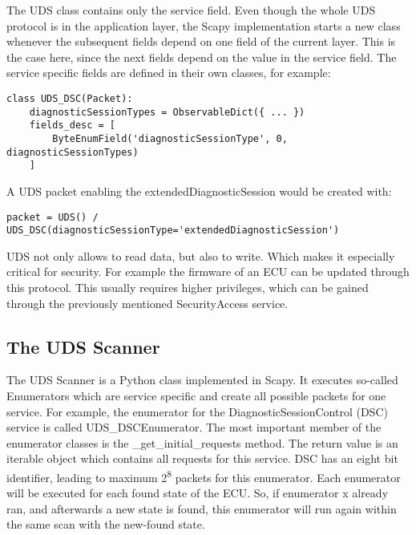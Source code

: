 
The UDS class contains only the service field. Even though the whole UDS protocol is in the application layer, the Scapy implementation starts a new class whenever the subsequent fields depend on one field of the current layer. This is the case here, since the next fields depend on the value in the service field. The service specific fields are defined in their own classes, for example:

\begin{samepage}
\begin{verbatim}
class UDS_DSC(Packet):
    diagnosticSessionTypes = ObservableDict({ ... })
    fields_desc = [
        ByteEnumField('diagnosticSessionType', 0,  diagnosticSessionTypes)
    ]
\end{verbatim}
\end{samepage}

A UDS packet enabling the extendedDiagnosticSession would be created with:

\begin{samepage}
\begin{verbatim}
packet = UDS() / UDS_DSC(diagnosticSessionType='extendedDiagnosticSession')
\end{verbatim}
\end{samepage}

UDS not only allows to read data, but also to write. Which makes it especially critical for security. For example the firmware of an ECU can be updated through this protocol. This usually requires higher privileges, which can be gained through the previously mentioned SecurityAccess service.


\subsection{The UDS Scanner}

The UDS Scanner is a Python class implemented in Scapy. It executes so-called Enumerators which are service specific and create all possible packets for one service.
For example, the enumerator for the DiagnosticSessionControl (DSC) service is called UDS\_DSCEnumerator. The most important member of the enumerator classes is the \_get\_initial\_requests method. The return value is an iterable object which contains all requests for this service. DSC has an eight bit identifier, leading to maximum 2\textsuperscript{8} packets for this enumerator. Each enumerator will be executed for each found state of the ECU. So, if enumerator x already ran, and afterwards a new state is found, this enumerator will run again within the same scan with the new-found state.

